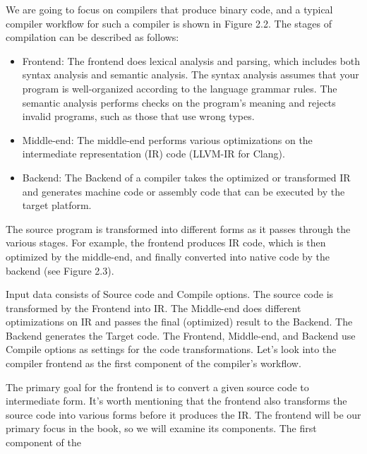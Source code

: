 We are going to focus on compilers that produce binary code, and a typical compiler workflow for such a compiler is shown in Figure 2.2. The stages of compilation can be described as follows:

\begin{itemize}
\item
Frontend: The frontend does lexical analysis and parsing, which includes both syntax analysis and semantic analysis. The syntax analysis assumes that your program is well-organized according to the language grammar rules. The semantic analysis performs checks on the program’s meaning and rejects invalid programs, such as those that use wrong types.

\item
Middle-end: The middle-end performs various optimizations on the intermediate representation (IR) code (LLVM-IR for Clang).

\item
Backend: The Backend of a compiler takes the optimized or transformed IR and generates machine code or assembly code that can be executed by the target platform.
\end{itemize}

The source program is transformed into different forms as it passes through the various stages. For example, the frontend produces IR code, which is then optimized by the middle-end, and finally converted into native code by the backend (see Figure 2.3).


Input data consists of Source code and Compile options. The source code is transformed by the Frontend into IR. The Middle-end does different optimizations on IR and passes the final (optimized) result to the Backend. The Backend generates the Target code. The Frontend, Middle-end, and Backend use Compile options as settings for the code transformations. Let’s look into the compiler frontend as the first component of the compiler’s workflow.


The primary goal for the frontend is to convert a given source code to intermediate form. It’s worth mentioning that the frontend also transforms the source code into various forms before it produces the IR. The frontend will be our primary focus in the book, so we will examine its components. The first component of the

